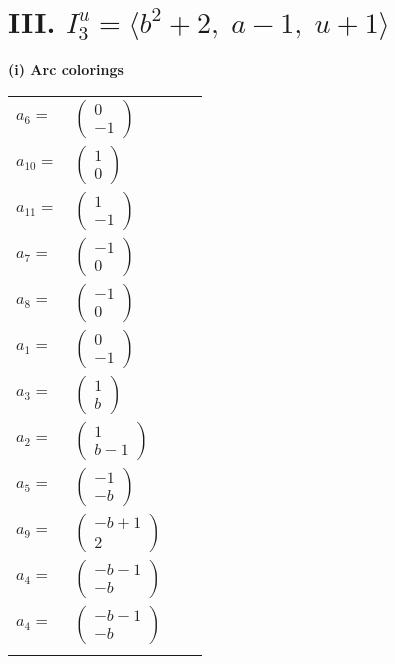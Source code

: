 \documentclass[1p]{elsarticle_modified}
\theoremstyle{definition}
\begin{document}
\centering \section*{III. $I^u_{3}= \langle b^2+2,\;a-1,\;u+1 \rangle$}
\flushleft \textbf{(i) Arc colorings}\\
\begin{tabular}{m{7pt} m{180pt} m{7pt} m{180pt} }
\flushright $a_{6}=$&$\begin{pmatrix}0\\-1\end{pmatrix}$ \\
\flushright $a_{10}=$&$\begin{pmatrix}1\\0\end{pmatrix}$ \\
\flushright $a_{11}=$&$\begin{pmatrix}1\\-1\end{pmatrix}$ \\
\flushright $a_{7}=$&$\begin{pmatrix}-1\\0\end{pmatrix}$ \\
\flushright $a_{8}=$&$\begin{pmatrix}-1\\0\end{pmatrix}$ \\
\flushright $a_{1}=$&$\begin{pmatrix}0\\-1\end{pmatrix}$ \\
\flushright $a_{3}=$&$\begin{pmatrix}1\\b\end{pmatrix}$ \\
\flushright $a_{2}=$&$\begin{pmatrix}1\\b-1\end{pmatrix}$ \\
\flushright $a_{5}=$&$\begin{pmatrix}-1\\- b\end{pmatrix}$ \\
\flushright $a_{9}=$&$\begin{pmatrix}- b+1\\2\end{pmatrix}$ \\
\flushright $a_{4}=$&$\begin{pmatrix}- b-1\\- b\end{pmatrix}$\\ \flushright $a_{4}=$&$\begin{pmatrix}- b-1\\- b\end{pmatrix}$\\&\end{tabular}
\end{document}
